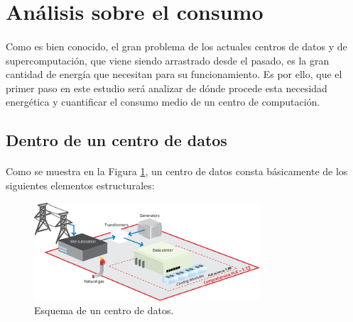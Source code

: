 \documentclass[10pt]{article}
\begin{document}
  \section{Análisis sobre el consumo}
  \label{sec:analisis}
  	\paragraph{}
	Como es bien conocido, el gran problema de los actuales centros de datos y de supercomputación, que viene siendo arrastrado desde el pasado, es la gran cantidad de energía que necesitan para su funcionamiento. Es por ello, que el primer paso en este estudio será analizar de dónde procede esta necesidad energética y cuantificar el consumo medio de un centro de computación.

    \subsection{Dentro de un centro de datos}
			\paragraph{}
            Como se muestra en la Figura \ref{image:datacenter}, un centro de datos consta básicamente de los siguientes elementos estructurales:
                        
            \begin{figure}[htpb!]
				\begin{center}
					\includegraphics[width=0.75\textwidth]{pue-comprehensive}
					\caption{Esquema de un centro de datos.\cite{google:dc-schema}}
					\label{image:datacenter}
				\end{center}
			\end{figure}
            
\end{document}
